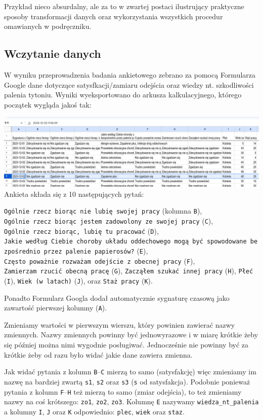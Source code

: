 \documentclass[
  openany]{book}
\begin{document}
Przykład nieco absurdalny, ale za to w zwartej postaci ilustrujący
praktyczne sposoby transformacji danych oraz
wykorzystania wszystkich procedur omawianych w podręczniku.

\hypertarget{wczytanie-danych}{%
\subsection{Wczytanie danych}\label{wczytanie-danych}}

W wyniku przeprowadzenia badania ankietowego zebrano za pomocą Formularza Google
dane dotyczące
satysfkacji/zamiaru odejścia oraz wiedzy nt. szkodliwości palenia tytoniu.
Wyniki wyeksportowano do arkusza kalkulacyjnego, którego początek
wygląda jakoś tak:

\includegraphics{./GoogleFormsTestA.png}
Ankieta składa się z 10 następujących pytań:

\texttt{Ogólnie\ rzecz\ biorąc\ nie\ lubię\ swojej\ pracy} (kolumna \texttt{B}),
\texttt{Ogólnie\ rzecz\ biorąc\ jestem\ zadowolony\ ze\ swojej\ pracy} (\texttt{C}),
\texttt{Ogólnie\ rzecz\ biorąc,\ lubię\ tu\ pracować} (\texttt{D}),
\texttt{Jakie\ według\ Ciebie\ choroby\ układu\ oddechowego\ mogą\ być\ spowodowane\ bezpośrednio\ przez\ palenie\ papierosów?} (\texttt{E}),
\texttt{Często\ poważnie\ rozważam\ odejście\ z\ obecnej\ pracy} (\texttt{F}),
\texttt{Zamierzam\ rzucić\ obecną\ pracę} (\texttt{G}),
\texttt{Zacząłem\ szukać\ innej\ pracy} (\texttt{H}),
\texttt{Płeć} (\texttt{I}),
\texttt{Wiek\ (w\ latach)} (\texttt{J}),
oraz \texttt{Staż\ pracy} (\texttt{K}).

Ponadto Formularz Googla dodał automatycznie sygnaturę czasową
jako zawartość pierwszej kolumny (\texttt{A}).

Zmieniamy wartości w pierwszym wierszu, który powinien zawierać nazwy zmiennych.
Nazwy zmiennych powinny być jednowyrazowe i w miarę krótkie żeby się później
można nimi wygodnie posługiwać. Jednocześnie nie powinny być za krótkie żeby
od razu było widać jakie dane zawiera zmienna.

Jak widać
pytania z kolumn \texttt{B}--\texttt{C} mierzą to samo (satysfakcję)
więc zmieniamy im nazwę na bardziej zwartą \texttt{s1}, \texttt{s2} oraz \texttt{s3} (\texttt{s} od satysfakcja).
Podobnie
ponieważ pytania z kolumn \texttt{F}--\texttt{H} też mierzą to samo (zmiar odejścia), to
też zmieniamy nazwy na coś krótszego: \texttt{zo1}, \texttt{zo2}, \texttt{zo3}. Kolumnę \texttt{E} nazywamy
\texttt{wiedza\_nt\_palenia} a kolumny \texttt{I}, \texttt{J} oraz \texttt{K} odpowiednio:
\texttt{plec}, \texttt{wiek} oraz \texttt{staz}.
\end{document}
